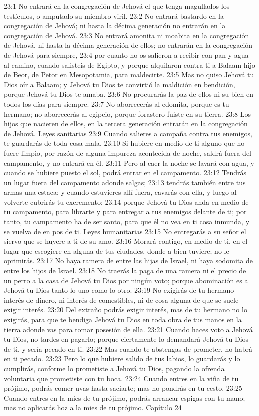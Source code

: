 23:1 No entrará en la congregación de Jehová el que tenga magullados los testículos, o amputado su miembro viril.  
23:2 No entrará bastardo en la congregación de Jehová; ni hasta la décima generación no entrarán en la congregación de Jehová.  
23:3 No entrará amonita ni moabita en la congregación de Jehová, ni hasta la décima generación de ellos; no entrarán en la congregación de Jehová para siempre,  
23:4 por cuanto no os salieron a recibir con pan y agua al camino, cuando salisteis de Egipto, y porque alquilaron contra ti a Balaam hijo de Beor, de Petor en Mesopotamia, para maldecirte.  
23:5 Mas no quiso Jehová tu Dios oír a Balaam; y Jehová tu Dios te convirtió la maldición en bendición, porque Jehová tu Dios te amaba.  
23:6 No procurarás la paz de ellos ni su bien en todos los días para siempre.  
23:7 No aborrecerás al edomita, porque es tu hermano; no aborrecerás al egipcio, porque forastero fuiste en su tierra.  
23:8 Los hijos que nacieren de ellos, en la tercera generación entrarán en la congregación de Jehová.  
Leyes sanitarias  
23:9 Cuando salieres a campaña contra tus enemigos, te guardarás de toda cosa mala.  
23:10 Si hubiere en medio de ti alguno que no fuere limpio, por razón de alguna impureza acontecida de noche, saldrá fuera del campamento, y no entrará en él.  
23:11 Pero al caer la noche se lavará con agua, y cuando se hubiere puesto el sol, podrá entrar en el campamento.  
23:12 Tendrás un lugar fuera del campamento adonde salgas;  
23:13 tendrás también entre tus armas una estaca; y cuando estuvieres allí fuera, cavarás con ella, y luego al volverte cubrirás tu excremento;  
23:14 porque Jehová tu Dios anda en medio de tu campamento, para librarte y para entregar a tus enemigos delante de ti; por tanto, tu campamento ha de ser santo, para que él no vea en ti cosa inmunda, y se vuelva de en pos de ti.  
Leyes humanitarias  
23:15 No entregarás a su señor el siervo que se huyere a ti de su amo.  
23:16 Morará contigo, en medio de ti, en el lugar que escogiere en alguna de tus ciudades, donde a bien tuviere; no le oprimirás.  
23:17 No haya ramera de entre las hijas de Israel, ni haya sodomita de entre los hijos de Israel.  
23:18 No traerás la paga de una ramera ni el precio de un perro a la casa de Jehová tu Dios por ningún voto; porque abominación es a Jehová tu Dios tanto lo uno como lo otro.  
23:19 No exigirás de tu hermano interés de dinero, ni interés de comestibles, ni de cosa alguna de que se suele exigir interés.  
23:20 Del extraño podrás exigir interés, mas de tu hermano no lo exigirás, para que te bendiga Jehová tu Dios en toda obra de tus manos en la tierra adonde vas para tomar posesión de ella. 
23:21 Cuando haces voto a Jehová tu Dios, no tardes en pagarlo; porque ciertamente lo demandará Jehová tu Dios de ti, y sería pecado en ti.  
23:22 Mas cuando te abstengas de prometer, no habrá en ti pecado. 
23:23 Pero lo que hubiere salido de tus labios, lo guardarás y lo cumplirás, conforme lo prometiste a Jehová tu Dios, pagando la ofrenda voluntaria que prometiste con tu boca.  
23:24 Cuando entres en la viña de tu prójimo, podrás comer uvas hasta saciarte; mas no pondrás en tu cesto.  
23:25 Cuando entres en la mies de tu prójimo, podrás arrancar espigas con tu mano; mas no aplicarás hoz a la mies de tu prójimo. 
Capítulo 24 

